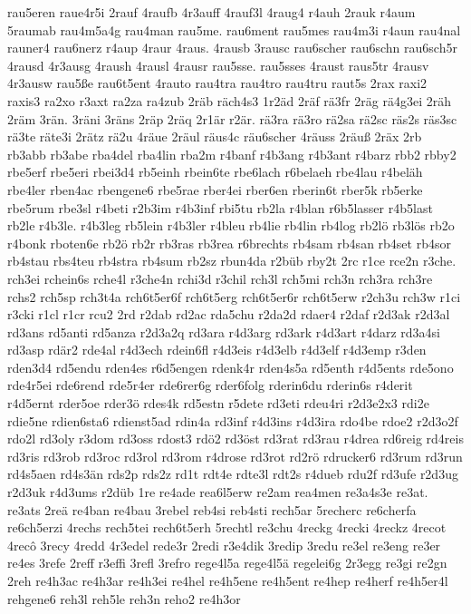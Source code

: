 {rau5eren
raue4r5i
2rauf
4raufb
4r3auff
4rauf3l
4raug4
r4auh
2rauk
r4aum
5raumab
rau4m5a4g
rau4man
rau5me.
rau6ment
rau5mes
rau4m3i
r4aun
rau4nal
rauner4
rau6nerz
r4aup
4raur
4raus.
4rausb
3rausc
rau6scher
rau6schn
rau6sch5r
4rausd
4r3ausg
4raush
4rausl
4rausr
rau5sse.
rau5sses
4raust
raus5tr
4rausv
4r3ausw
rau5ße
rau6t5ent
4rauto
rau4tra
rau4tro
rau4tru
raut5s
2rax
raxi2
raxis3
ra2xo
r3axt
ra2za
ra4zub
2räb
räch4s3
1r2äd
2räf
rä3fr
2räg
rä4g3ei
2räh
2räm
3rän.
3räni
3räns
2räp
2räq
2r1är
r2är.
rä3ra
rä3ro
rä2sa
rä2sc
räs2s
räs3sc
rä3te
räte3i
2rätz
rä2u
4räue
2räul
räus4c
räu6scher
4räuss
2räuß
2räx
2rb
rb3abb
rb3abe
rba4del
rba4lin
rba2m
r4banf
r4b3ang
r4b3ant
r4barz
rbb2
rbby2
rbe5erf
rbe5eri
rbei3d4
rb5einh
rbein6te
rbe6lach
r6belaeh
rbe4lau
r4beläh
rbe4ler
rben4ac
rbengene6
rbe5rae
rber4ei
rber6en
rberin6t
rber5k
rb5erke
rbe5rum
rbe3sl
r4beti
r2b3im
r4b3inf
rbi5tu
rb2la
r4blan
r6b5lasser
r4b5last
rb2le
r4b3le.
r4b3leg
rb5lein
r4b3ler
r4bleu
rb4lie
rb4lin
rb4log
rb2lö
rb3lös
rb2o
r4bonk
rboten6e
rb2ö
rb2r
rb3ras
rb3rea
r6brechts
rb4sam
rb4san
rb4set
rb4sor
rb4stau
rbs4teu
rb4stra
rb4sum
rb2sz
rbun4da
r2büb
rby2t
2rc
r1ce
rce2n
r3che.
rch3ei
rchein6s
rche4l
r3che4n
rchi3d
r3chil
rch3l
rch5mi
rch3n
rch3ra
rch3re
rchs2
rch5sp
rch3t4a
rch6t5er6f
rch6t5erg
rch6t5er6r
rch6t5erw
r2ch3u
rch3w
r1ci
r3cki
r1cl
r1cr
rcu2
2rd
r2dab
rd2ac
rda5chu
r2da2d
rdaer4
r2daf
r2d3ak
r2d3al
rd3ans
rd5anti
rd5anza
r2d3a2q
rd3ara
r4d3arg
rd3ark
r4d3art
r4darz
rd3a4si
rd3asp
rdär2
rde4al
r4d3ech
rdein6fl
r4d3eis
r4d3elb
r4d3elf
r4d3emp
r3den
rden3d4
rd5endu
rden4es
r6d5engen
rdenk4r
rden4s5a
rd5enth
r4d5ents
rde5ono
rde4r5ei
rde6rend
rde5r4er
rde6rer6g
rder6folg
rderin6du
rderin6s
r4derit
r4d5ernt
rder5oe
rder3ö
rdes4k
rd5estn
r5dete
rd3eti
rdeu4ri
r2d3e2x3
rdi2e
rdie5ne
rdien6sta6
rdienst5ad
rdin4a
rd3inf
r4d3ins
r4d3ira
rdo4be
rdoe2
r2d3o2f
rdo2l
rd3oly
r3dom
rd3oss
rdost3
rdö2
rd3öst
rd3rat
rd3rau
r4drea
rd6reig
rd4reis
rd3ris
rd3rob
rd3roc
rd3rol
rd3rom
r4drose
rd3rot
rd2rö
rdrucker6
rd3rum
rd3run
rd4s5aen
rd4s3än
rds2p
rds2z
rd1t
rdt4e
rdte3l
rdt2s
r4dueb
rdu2f
rd3ufe
r2d3ug
r2d3uk
r4d3ums
r2düb
1re
re4ade
rea6l5erw
re2am
rea4men
re3a4s3e
re3at.
re3ats
2reä
re4ban
re4bau
3rebel
reb4si
reb4sti
rech5ar
5recherc
re6cherfa
re6ch5erzi
4rechs
rech5tei
rech6t5erh
5rechtl
re3chu
4reckg
4recki
4reckz
4recot
4recô
3recy
4redd
4r3edel
rede3r
2redi
r3e4dik
3redip
3redu
re3el
re3eng
re3er
re4es
3refe
2reff
r3effi
3refl
3refro
rege4l5a
rege4l5ä
regelei6g
2r3egg
re3gi
re2gn
2reh
re4h3ac
re4h3ar
re4h3ei
re4hel
re4h5ene
re4h5ent
re4hep
re4herf
re4h5er4l
rehgene6
reh3l
reh5le
reh3n
reho2
re4h3or
}
